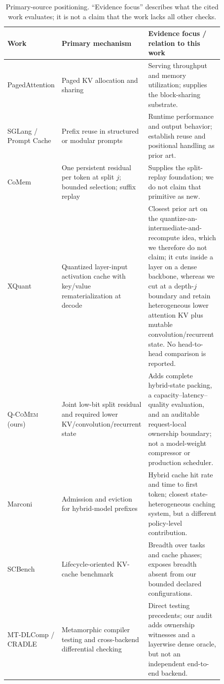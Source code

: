 \documentclass{article}
\newcommand{\qcomem}{\textsc{Q-CoMem}}
\begin{document}
\begin{table}[H]
  \caption{Primary-source positioning.  ``Evidence focus'' describes what the
  cited work evaluates; it is not a claim that the work lacks all other checks.}
  \label{tab:closest}
  \centering
  \footnotesize
  \begin{tabular}{@{}p{0.16\linewidth}p{0.28\linewidth}p{0.43\linewidth}@{}}
    \toprule
    Work & Primary mechanism & Evidence focus / relation to this work \\
    \midrule
    PagedAttention & Paged KV allocation and sharing~\citep{kwon2023pagedattention} & Serving throughput and memory utilization; supplies the block-sharing substrate. \\
    SGLang / Prompt Cache & Prefix reuse in structured or modular prompts~\citep{zheng2024sglang,gim2024promptcache} & Runtime performance and output behavior; establish reuse and positional handling as prior art. \\
    CoMem & One persistent residual per token at split $j$; bounded selection; suffix replay~\citep{liu2026comem,liu2026understanding} & Supplies the split-replay foundation; we do not claim that primitive as new. \\
    XQuant & Quantized layer-input activation cache with key/value rematerialization at decode~\citep{tomar2025xquant} & Closest prior art on the quantize-an-intermediate-and-recompute idea, which we therefore do not claim; it cuts inside a layer on a dense backbone, whereas we cut at a depth-$j$ boundary and retain heterogeneous lower attention KV plus mutable convolution/recurrent state. No head-to-head comparison is reported. \\
    \qcomem{} (ours) & Joint low-bit split residual and required lower KV/convolution/recurrent state & Adds complete hybrid-state packing, a capacity--latency--quality evaluation, and an auditable request-local ownership boundary; not a model-weight compressor or production scheduler. \\
    Marconi & Admission and eviction for hybrid-model prefixes~\citep{pan2025marconi} & Hybrid cache hit rate and time to first token; closest state-heterogeneous caching system, but a different policy-level contribution. \\
    SCBench & Lifecycle-oriented KV-cache benchmark~\citep{li2025scbench} & Breadth over tasks and cache phases; exposes breadth absent from our bounded declared configurations. \\
    MT-DLComp / CRADLE & Metamorphic compiler testing and cross-backend differential checking~\citep{xiao2022metamorphic,pham2019cradle} & Direct testing precedents; our audit adds ownership witnesses and a layerwise dense oracle, but not an independent end-to-end backend. \\

\end{tabular}
\end{table}
\end{document}

